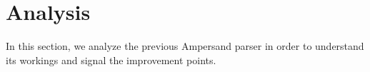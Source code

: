 
\section{Analysis}
\label{sec:analysis}
In this section, we analyze the previous Ampersand parser in order to understand its workings and signal the improvement points.






